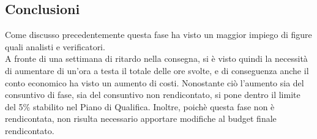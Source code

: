 \documentclass[../piano_di_progetto.tex]{subfiles}
\begin{document}
\subsection{ Conclusioni}%
\label{sub:cons_fine}
Come discusso precedentemente questa fase ha visto un maggior impiego di figure quali analisti e verificatori.\\
A fronte di una settimana di ritardo nella consegna, si è visto quindi la necessità di aumentare di un'ora a testa il totale delle ore svolte, e di conseguenza anche il conto economico ha visto un aumento di costi. Nonostante ciò l'aumento sia del consuntivo di fase, sia del consuntivo non rendicontato, si pone dentro il limite del 5\% stabilito nel Piano di Qualifica. Inoltre, poichè questa fase non è rendicontata, non risulta necessario apportare modifiche al budget finale rendicontato.
\end{document}
